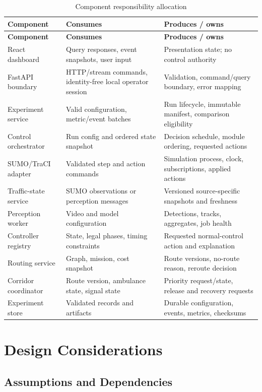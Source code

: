 \begin{longtable}{p{}p{}p{}}
\caption{Component responsibility allocation}\label{tab:components}\\
\toprule
\textbf{Component} & \textbf{Consumes} & \textbf{Produces / owns}\\
\midrule\endfirsthead
\toprule
\textbf{Component} & \textbf{Consumes} & \textbf{Produces / owns}\\
\midrule\endhead
React dashboard & Query responses, event snapshots, user input & Presentation state; no control authority\\
FastAPI boundary & HTTP/stream commands, identity-free local operator session & Validation, command/query boundary, error mapping\\
Experiment service & Valid configuration, metric/event batches & Run lifecycle, immutable manifest, comparison eligibility\\
Control orchestrator & Run config and ordered state snapshot & Decision schedule, module ordering, requested actions\\
SUMO/TraCI adapter & Validated step and action commands & Simulation process, clock, subscriptions, applied actions\\
Traffic-state service & SUMO observations or perception messages & Versioned source-specific snapshots and freshness\\
Perception worker & Video and model configuration & Detections, tracks, aggregates, job health\\
Controller registry & State, legal phases, timing constraints & Requested normal-control action and explanation\\
Routing service & Graph, mission, cost snapshot & Route versions, no-route reason, reroute decision\\
Corridor coordinator & Route version, ambulance state, signal state & Priority request/state, release and recovery requests\\
Experiment store & Validated records and artifacts & Durable configuration, events, metrics, checksums\\
\bottomrule
\end{longtable}

\section{Design Considerations}

\subsection{Assumptions and Dependencies}

